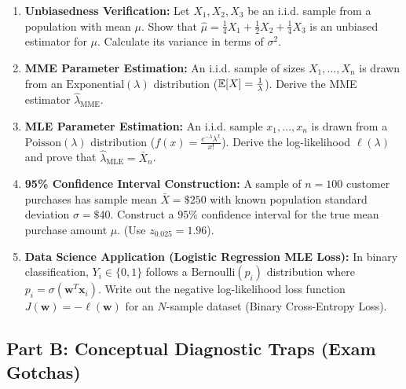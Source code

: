 \begin{enumerate}
\item \textbf{Unbiasedness Verification:} Let $X_1, X_2, X_3$ be an i.i.d. sample from a population with mean $\mu$. Show that $\hat{\mu} = \frac{1}{4} X_1 + \frac{1}{2} X_2 + \frac{1}{4} X_3$ is an unbiased estimator for $\mu$. Calculate its variance in terms of $\sigma^2$.

\item \textbf{MME Parameter Estimation:} An i.i.d. sample of sizes $X_1, \dots, X_n$ is drawn from an $\text{Exponential}(\lambda)$ distribution ($\mathbb{E}[X] = \frac{1}{\lambda}$). Derive the MME estimator $\hat{\lambda}_{\text{MME}}$.

\item \textbf{MLE Parameter Estimation:} An i.i.d. sample $x_1, \dots, x_n$ is drawn from a $\text{Poisson}(\lambda)$ distribution ($f(x) = \frac{e^{-\lambda} \lambda^x}{x!}$). Derive the log-likelihood $\ell(\lambda)$ and prove that $\hat{\lambda}_{\text{MLE}} = \bar{X}_n$.

\item \textbf{95\% Confidence Interval Construction:} A sample of $n = 100$ customer purchases has sample mean $\bar{X} = \$250$ with known population standard deviation $\sigma = \$40$. Construct a $95\%$ confidence interval for the true mean purchase amount $\mu$. (Use $z_{0.025} = 1.96$).

\item \textbf{Data Science Application (Logistic Regression MLE Loss):} In binary classification, $Y_i \in \{0, 1\}$ follows a $\text{Bernoulli}(p_i)$ distribution where $p_i = \sigma(\mathbf{w}^T \mathbf{x}_i)$. Write out the negative log-likelihood loss function $J(\mathbf{w}) = -\ell(\mathbf{w})$ for an $N$-sample dataset (Binary Cross-Entropy Loss).
\end{enumerate}

\subsection*{Part B: Conceptual Diagnostic Traps (Exam Gotchas)}

